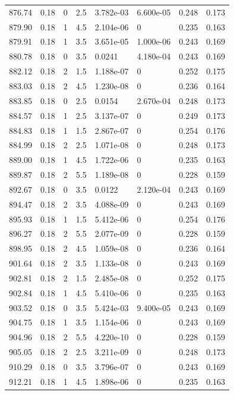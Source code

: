 \documentclass[preview]{standalone}
\begin{document}
{{{{{{{{{{{{{{{\begin{tabular}{L{1.2cm}C{1.2cm} C{0.3cm}C{0.5cm} C{1.4cm}C{1.4cm} C{1.4cm}C{1.4cm}}
  876.74  &  0.18  & 0     & 2.5 &  3.782e-03  & 6.600e-05  & 0.248 &  0.173   \\ 
  879.90  &  0.18  & 1     & 4.5 &  2.104e-06  & 0  & 0.235 &  0.163   \\ 
  879.91  &  0.18  & 1     & 3.5 &  3.651e-05  & 1.000e-06  & 0.243 &  0.169   \\ 
  880.78  &  0.18  & 0     & 3.5 &  0.0241  & 4.180e-04  & 0.243 &  0.169   \\ 
  882.12  &  0.18  & 2     & 1.5 &  1.188e-07  & 0  & 0.252 &  0.175   \\ 
  883.03  &  0.18  & 2     & 4.5 &  1.230e-08  & 0  & 0.236 &  0.164   \\ 
  883.85  &  0.18  & 0     & 2.5 &  0.0154  & 2.670e-04  & 0.248 &  0.173   \\ 
  884.57  &  0.18  & 1     & 2.5 &  3.137e-07  & 0  & 0.249 &  0.173   \\ 
  884.83  &  0.18  & 1     & 1.5 &  2.867e-07  & 0  & 0.254 &  0.176   \\ 
  884.99  &  0.18  & 2     & 2.5 &  1.071e-08  & 0  & 0.248 &  0.173   \\ 
  889.00  &  0.18  & 1     & 4.5 &  1.722e-06  & 0  & 0.235 &  0.163   \\ 
  889.87  &  0.18  & 2     & 5.5 &  1.189e-08  & 0  & 0.228 &  0.159   \\ 
  892.67  &  0.18  & 0     & 3.5 &  0.0122  & 2.120e-04  & 0.243 &  0.169   \\ 
  894.47  &  0.18  & 2     & 3.5 &  4.088e-09  & 0  & 0.243 &  0.169   \\ 
  895.93  &  0.18  & 1     & 1.5 &  5.412e-06  & 0  & 0.254 &  0.176   \\ 
  896.27  &  0.18  & 2     & 5.5 &  2.077e-09  & 0  & 0.228 &  0.159   \\ 
  898.95  &  0.18  & 2     & 4.5 &  1.059e-08  & 0  & 0.236 &  0.164   \\ 
  901.64  &  0.18  & 2     & 3.5 &  1.133e-08  & 0  & 0.243 &  0.169   \\ 
  902.81  &  0.18  & 2     & 1.5 &  2.485e-08  & 0  & 0.252 &  0.175   \\ 
  902.84  &  0.18  & 1     & 4.5 &  5.410e-06  & 0  & 0.235 &  0.163   \\ 
  903.52  &  0.18  & 0     & 3.5 &  5.424e-03  & 9.400e-05  & 0.243 &  0.169   \\ 
  904.75  &  0.18  & 1     & 3.5 &  1.154e-06  & 0  & 0.243 &  0.169   \\ 
  904.96  &  0.18  & 2     & 5.5 &  4.220e-10  & 0  & 0.228 &  0.159   \\ 
  905.05  &  0.18  & 2     & 2.5 &  3.211e-09  & 0  & 0.248 &  0.173   \\ 
  910.29  &  0.18  & 0     & 3.5 &  3.796e-07  & 0  & 0.243 &  0.169   \\ 
  912.21  &  0.18  & 1     & 4.5 &  1.898e-06  & 0  & 0.235 &  0.163   \\ 
\hline 
\end{tabular} 

}}}}}}}}}}}}}}}
\end{document}
